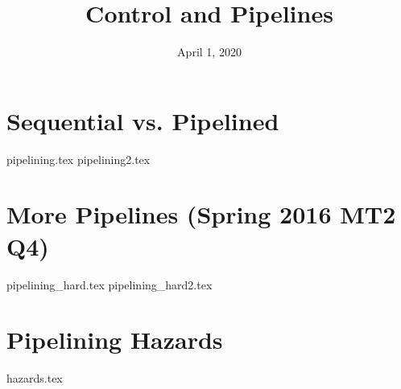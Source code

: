 \documentclass[11pt]{exam}
\title{Control and Pipelines}
\date{April 1, 2020}
\begin{document}
\maketitle

\section{Sequential vs. Pipelined}
\begin{questions}
{pipelining.tex}
{pipelining2.tex}
\end{questions}
\newpage

\section{More Pipelines (Spring 2016 MT2 Q4)}
\begin{questions}
{pipelining_hard.tex}
{pipelining_hard2.tex}
\end{questions}
\newpage

\section{Pipelining Hazards}
\begin{questions}
{hazards.tex}
\end{questions}
\end{document}
